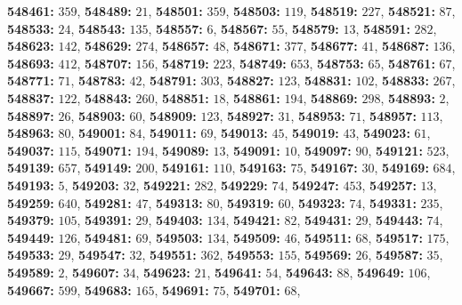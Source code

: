 \textsf{\bfseries 548461:} $359$, \textsf{\bfseries 548489:} $21$, \textsf{\bfseries 548501:} $359$, \textsf{\bfseries 548503:} $119$, \textsf{\bfseries 548519:} $227$, \textsf{\bfseries 548521:} $87$, \textsf{\bfseries 548533:} $24$, \textsf{\bfseries 548543:} $135$, \textsf{\bfseries 548557:} $6$, \textsf{\bfseries 548567:} $55$, \textsf{\bfseries 548579:} $13$, \textsf{\bfseries 548591:} $282$, \textsf{\bfseries 548623:} $142$, \textsf{\bfseries 548629:} $274$, \textsf{\bfseries 548657:} $48$, \textsf{\bfseries 548671:} $377$, \textsf{\bfseries 548677:} $41$, \textsf{\bfseries 548687:} $136$, \textsf{\bfseries 548693:} $412$, \textsf{\bfseries 548707:} $156$, \textsf{\bfseries 548719:} $223$, \textsf{\bfseries 548749:} $653$, \textsf{\bfseries 548753:} $65$, \textsf{\bfseries 548761:} $67$, \textsf{\bfseries 548771:} $71$, \textsf{\bfseries 548783:} $42$, \textsf{\bfseries 548791:} $303$, \textsf{\bfseries 548827:} $123$, \textsf{\bfseries 548831:} $102$, \textsf{\bfseries 548833:} $267$, \textsf{\bfseries 548837:} $122$, \textsf{\bfseries 548843:} $260$, \textsf{\bfseries 548851:} $18$, \textsf{\bfseries 548861:} $194$, \textsf{\bfseries 548869:} $298$, \textsf{\bfseries 548893:} $2$, \textsf{\bfseries 548897:} $26$, \textsf{\bfseries 548903:} $60$, \textsf{\bfseries 548909:} $123$, \textsf{\bfseries 548927:} $31$, \textsf{\bfseries 548953:} $71$, \textsf{\bfseries 548957:} $113$, \textsf{\bfseries 548963:} $80$, \textsf{\bfseries 549001:} $84$, \textsf{\bfseries 549011:} $69$, \textsf{\bfseries 549013:} $45$, \textsf{\bfseries 549019:} $43$, \textsf{\bfseries 549023:} $61$, \textsf{\bfseries 549037:} $115$, \textsf{\bfseries 549071:} $194$, \textsf{\bfseries 549089:} $13$, \textsf{\bfseries 549091:} $10$, \textsf{\bfseries 549097:} $90$, \textsf{\bfseries 549121:} $523$, \textsf{\bfseries 549139:} $657$, \textsf{\bfseries 549149:} $200$, \textsf{\bfseries 549161:} $110$, \textsf{\bfseries 549163:} $75$, \textsf{\bfseries 549167:} $30$, \textsf{\bfseries 549169:} $684$, \textsf{\bfseries 549193:} $5$, \textsf{\bfseries 549203:} $32$, \textsf{\bfseries 549221:} $282$, \textsf{\bfseries 549229:} $74$, \textsf{\bfseries 549247:} $453$, \textsf{\bfseries 549257:} $13$, \textsf{\bfseries 549259:} $640$, \textsf{\bfseries 549281:} $47$, \textsf{\bfseries 549313:} $80$, \textsf{\bfseries 549319:} $60$, \textsf{\bfseries 549323:} $74$, \textsf{\bfseries 549331:} $235$, \textsf{\bfseries 549379:} $105$, \textsf{\bfseries 549391:} $29$, \textsf{\bfseries 549403:} $134$, \textsf{\bfseries 549421:} $82$, \textsf{\bfseries 549431:} $29$, \textsf{\bfseries 549443:} $74$, \textsf{\bfseries 549449:} $126$, \textsf{\bfseries 549481:} $69$, \textsf{\bfseries 549503:} $134$, \textsf{\bfseries 549509:} $46$, \textsf{\bfseries 549511:} $68$, \textsf{\bfseries 549517:} $175$, \textsf{\bfseries 549533:} $29$, \textsf{\bfseries 549547:} $32$, \textsf{\bfseries 549551:} $362$, \textsf{\bfseries 549553:} $155$, \textsf{\bfseries 549569:} $26$, \textsf{\bfseries 549587:} $35$, \textsf{\bfseries 549589:} $2$, \textsf{\bfseries 549607:} $34$, \textsf{\bfseries 549623:} $21$, \textsf{\bfseries 549641:} $54$, \textsf{\bfseries 549643:} $88$, \textsf{\bfseries 549649:} $106$, \textsf{\bfseries 549667:} $599$, \textsf{\bfseries 549683:} $165$, \textsf{\bfseries 549691:} $75$, \textsf{\bfseries 549701:} $68$, 
